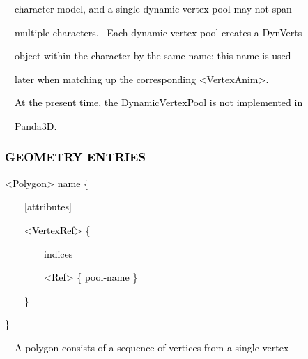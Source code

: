 \documentclass[a4paper]{article}
\newcommand\textstyleOOoComputerKeyWord[1]{\textrm{\textcolor[rgb]{0.0,0.0,0.5019608}{#1}}}
\begin{document}
{\color{black}
\textstyleOOoComputerKeyWord{\textcolor{black}{\ \ character model, and a single dynamic vertex pool may not span}}}

{\color{black}
\textstyleOOoComputerKeyWord{\textcolor{black}{\ \ multiple characters. \ Each dynamic vertex pool creates a DynVerts}}}

{\color{black}
\textstyleOOoComputerKeyWord{\textcolor{black}{\ \ object within the character by the same name; this name is used}}}

{\color{black}
\textstyleOOoComputerKeyWord{\textcolor{black}{\ \ later when matching up the corresponding
{\textless}VertexAnim{\textgreater}.}}}


\bigskip

{\color{black}
\textstyleOOoComputerKeyWord{\textcolor{black}{\ \ At the present time, the DynamicVertexPool is not implemented in}}}

{\color{black}
\textstyleOOoComputerKeyWord{\textcolor{black}{\ \ Panda3D.}}}


\bigskip

\subsubsection[GEOMETRY ENTRIES]{\textstyleOOoComputerKeyWord{\textcolor{black}{GEOMETRY ENTRIES}}}
\hypertarget{RefHeading7678869075401}{}
\bigskip

{\color{black}
\textstyleOOoComputerKeyWord{\textcolor{black}{{\textless}Polygon{\textgreater} name \{ }}}

{\color{black}
\textstyleOOoComputerKeyWord{\textcolor{black}{\ \ \ \ [attributes] }}}

{\color{black}
\textstyleOOoComputerKeyWord{\textcolor{black}{\ \ \ \ {\textless}VertexRef{\textgreater} \{ }}}

{\color{black}
\textstyleOOoComputerKeyWord{\textcolor{black}{\ \ \ \ \ \ \ \ indices }}}

{\color{black}
\textstyleOOoComputerKeyWord{\textcolor{black}{\ \ \ \ \ \ \ \ {\textless}Ref{\textgreater} \{ pool-name \} }}}

{\color{black}
\textstyleOOoComputerKeyWord{\textcolor{black}{\ \ \ \ \} }}}

{\color{black}
\textstyleOOoComputerKeyWord{\textcolor{black}{\}}}}


\bigskip

\clearpage
\bigskip

{\color{black}
\textstyleOOoComputerKeyWord{\textcolor{black}{\ \ A polygon consists of a sequence of vertices from a single vertex}}}
\end{document}
